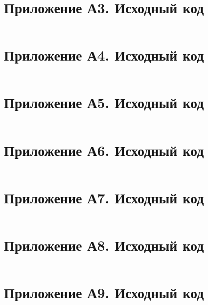 \documentclass[oneside,a4paper,14pt]{extarticle}
\begin{document}
\section*{Приложение А3. Исходный код}
\inputminted{c}{code/src/args_parser.c}

\section*{Приложение А4. Исходный код}
\inputminted{c}{code/src/window.h}

\section*{Приложение А5. Исходный код}
\inputminted{c}{code/src/window.c}

\section*{Приложение А6. Исходный код}
\inputminted{c}{code/src/render_gilbert.h}

\section*{Приложение А7. Исходный код}
\inputminted{c}{code/src/render_gilbert.c}

\section*{Приложение А8. Исходный код}
\inputminted{c}{code/src/utils.h}

\section*{Приложение А9. Исходный код}
\inputminted{c}{code/src/utils.c}
\end{document}
